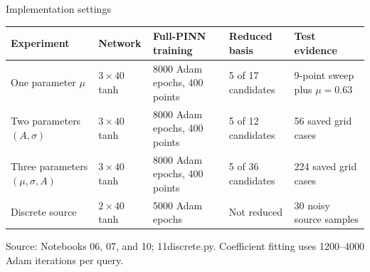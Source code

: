\documentclass[aspectratio=169,xcolor=dvipsnames,11pt]{beamer}
\newcommand{\src}[1]{%
  \vfill
  {\color{MidGray}\fontsize{6.5}{7.5}\selectfont Source: #1\par}
}
\begin{document}
\appendix

\begin{frame}{Implementation settings}
  \small
  \begin{tabularx}{\textwidth}{@{}lXXXX@{}}
    \toprule
    Experiment & Network & Full-PINN training & Reduced basis & Test evidence \\
    \midrule
    One parameter $\mu$
      & $3\times40$ tanh
      & 8000 Adam epochs, 400 points
      & 5 of 17 candidates
      & 9-point sweep plus $\mu=0.63$ \\
    Two parameters $(A,\sigma)$
      & $3\times40$ tanh
      & 8000 Adam epochs, 400 points
      & 5 of 12 candidates
      & 56 saved grid cases \\
    Three parameters $(\mu,\sigma,A)$
      & $3\times40$ tanh
      & 8000 Adam epochs, 400 points
      & 5 of 36 candidates
      & 224 saved grid cases \\
    Discrete source
      & $2\times40$ tanh
      & 5000 Adam epochs
      & Not reduced
      & 30 noisy source samples \\
    \bottomrule
  \end{tabularx}
  \src{Notebooks 06, 07, and 10; 11discrete.py. Coefficient fitting uses 1200--4000 Adam iterations per query.}
\end{frame}
\end{document}

